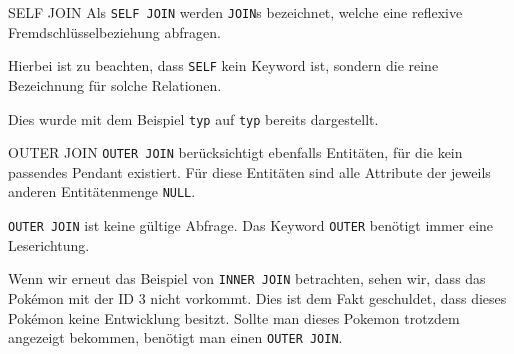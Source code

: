 \begin{sqlbonus}{SELF JOIN}
    Als \texttt{SELF JOIN} werden \texttt{JOIN}s bezeichnet, welche eine reflexive Fremdschlüsselbeziehung abfragen.

    Hierbei ist zu beachten, dass \texttt{SELF} kein Keyword ist, sondern die reine Bezeichnung für solche Relationen.

    Dies wurde mit dem Beispiel \texttt{typ} auf \texttt{typ} bereits dargestellt.
\end{sqlbonus}

\begin{sqlbonus}{OUTER JOIN}
    \texttt{OUTER JOIN} berücksichtigt ebenfalls Entitäten, für die kein passendes Pendant existiert.
    Für diese Entitäten sind alle Attribute der jeweils anderen Entitätenmenge \texttt{NULL}.

    \texttt{OUTER JOIN} ist keine gültige Abfrage.
    Das Keyword \texttt{OUTER} benötigt immer eine Leserichtung.

    Wenn wir erneut das Beispiel von \texttt{INNER JOIN} betrachten, sehen wir, dass das Pokémon mit der ID 3 nicht vorkommt.
    Dies ist dem Fakt geschuldet, dass dieses Pokémon keine Entwicklung besitzt.
    Sollte man dieses Pokemon trotzdem angezeigt bekommen, benötigt man einen \texttt{OUTER JOIN}.
\end{sqlbonus}

